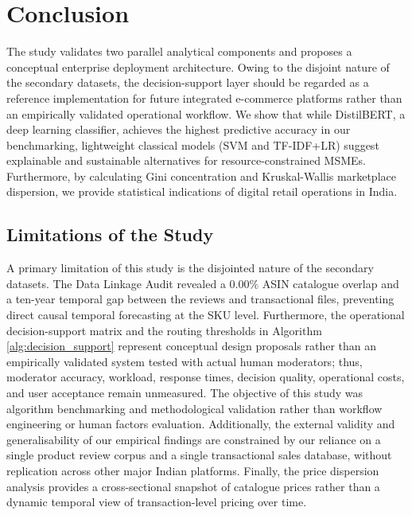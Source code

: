 \documentclass[authoryear,review,3p,times,12pt]{elsarticle}
\begin{document}
\section{Conclusion}
\label{sec:conclusion}
The study validates two parallel analytical components and proposes a conceptual enterprise deployment architecture. Owing to the disjoint nature of the secondary datasets, the decision-support layer should be regarded as a reference implementation for future integrated e-commerce platforms rather than an empirically validated operational workflow. We show that while DistilBERT, a deep learning classifier, achieves the highest predictive accuracy in our benchmarking, lightweight classical models (SVM and TF-IDF+LR) suggest explainable and sustainable alternatives for resource-constrained MSMEs. Furthermore, by calculating Gini concentration and Kruskal-Wallis marketplace dispersion, we provide statistical indications of digital retail operations in India.

\subsection{Limitations of the Study}
\label{sec:limitations}
A primary limitation of this study is the disjointed nature of the secondary datasets. The Data Linkage Audit revealed a $0.00\%$ ASIN catalogue overlap and a ten-year temporal gap between the reviews and transactional files, preventing direct causal temporal forecasting at the SKU level. Furthermore, the operational decision-support matrix and the routing thresholds in Algorithm \ref{alg:decision_support} represent conceptual design proposals rather than an empirically validated system tested with actual human moderators; thus, moderator accuracy, workload, response times, decision quality, operational costs, and user acceptance remain unmeasured. The objective of this study was algorithm benchmarking and methodological validation rather than workflow engineering or human factors evaluation. Additionally, the external validity and generalisability of our empirical findings are constrained by our reliance on a single product review corpus and a single transactional sales database, without replication across other major Indian platforms. Finally, the price dispersion analysis provides a cross-sectional snapshot of catalogue prices rather than a dynamic temporal view of transaction-level pricing over time.
\end{document}

